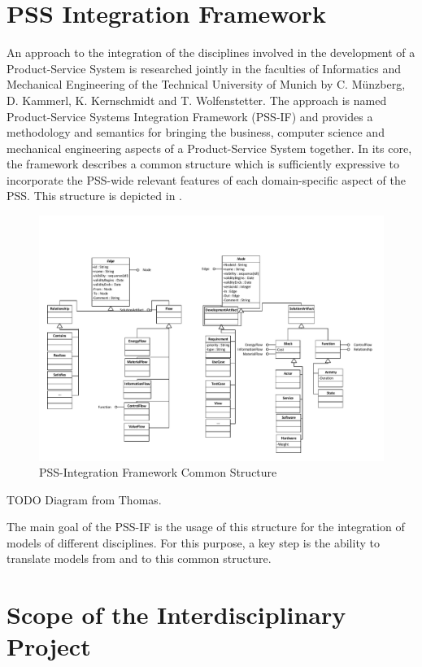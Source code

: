 \section*{PSS Integration Framework}

An approach to the integration of the disciplines involved in the development of a Product-Service System is researched jointly in the faculties of Informatics and Mechanical Engineering of the Technical University of Munich by C. M\"unzberg, D. Kammerl, K. Kernschmidt and T. Wolfenstetter. The approach is named Product-Service Systems Integration Framework (PSS-IF) and provides a methodology and semantics for bringing the business, computer science and mechanical engineering aspects of a Product-Service System together. In its core, the framework describes a common structure which is sufficiently expressive to incorporate the PSS-wide relevant features of each domain-specific aspect of the PSS. This structure is depicted in .

\begin{figure}
\centering
\includegraphics[width=\textwidth]{figures/PSSIF.pdf}
\caption{PSS-Integration Framework Common Structure}
\label{fig:canonic}
\end{figure}

\color{red}TODO Diagram from Thomas.\color{black}

The main goal of the PSS-IF is the usage of this structure for the integration of models of different disciplines. For this purpose, a key step is the ability to translate models from and to this common structure.

\section*{Scope of the Interdisciplinary Project}

